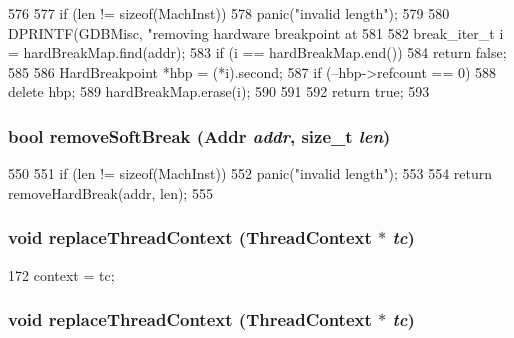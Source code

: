 \begin{DoxyCode}
576 {
577     if (len != sizeof(MachInst))
578         panic("invalid length\n");
579 
580     DPRINTF(GDBMisc, "removing hardware breakpoint at %
581 
582     break_iter_t i = hardBreakMap.find(addr);
583     if (i == hardBreakMap.end())
584         return false;
585 
586     HardBreakpoint *hbp = (*i).second;
587     if (--hbp->refcount == 0) {
588         delete hbp;
589         hardBreakMap.erase(i);
590     }
591 
592     return true;
593 }
\end{DoxyCode}
\hypertarget{classBaseRemoteGDB_a0ea4682895df85b1eba96a7050194393}{
\subsubsection[{removeSoftBreak}]{\setlength{\rightskip}{0pt plus 5cm}bool removeSoftBreak ({\bf Addr} {\em addr}, \/  size\_\-t {\em len})}}
\label{classBaseRemoteGDB_a0ea4682895df85b1eba96a7050194393}



\begin{DoxyCode}
550 {
551     if (len != sizeof(MachInst))
552         panic("invalid length\n");
553 
554     return removeHardBreak(addr, len);
555 }
\end{DoxyCode}
\hypertarget{classBaseRemoteGDB_a36909ca9ba5d0978fe30241da42a0e10}{
\subsubsection[{replaceThreadContext}]{\setlength{\rightskip}{0pt plus 5cm}void replaceThreadContext ({\bf ThreadContext} $\ast$ {\em tc})}}
\label{classBaseRemoteGDB_a36909ca9ba5d0978fe30241da42a0e10}



\begin{DoxyCode}
172 { context = tc; }
\end{DoxyCode}
\hypertarget{classBaseRemoteGDB_a36909ca9ba5d0978fe30241da42a0e10}{
\subsubsection[{replaceThreadContext}]{\setlength{\rightskip}{0pt plus 5cm}void replaceThreadContext ({\bf ThreadContext} $\ast$ {\em tc})}}
\label{classBaseRemoteGDB_a36909ca9ba5d0978fe30241da42a0e10}



